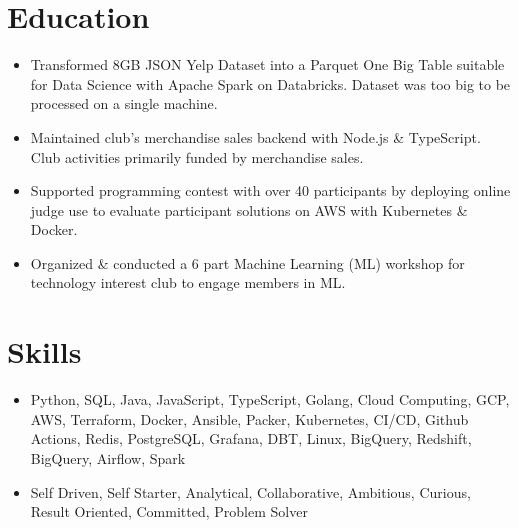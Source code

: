 \section{Education}
\begin{itemize}
  \item Transformed 8GB JSON Yelp Dataset into a Parquet One Big Table suitable for Data Science with Apache Spark on Databricks. Dataset was too big to be processed on a single machine.
  \item Maintained club's merchandise sales backend with Node.js \& TypeScript. Club activities primarily funded by merchandise sales.
\end{itemize}
\begin{itemize}
  \item Supported programming contest with over 40 participants by deploying online judge use to evaluate participant solutions on AWS with Kubernetes \& Docker.
  \item Organized \& conducted a 6 part Machine Learning  (ML) workshop for technology interest club to engage members in ML.
\end{itemize}
  
\section{Skills}
\begin{itemize}
  \item Python, SQL, Java, JavaScript, TypeScript, Golang, Cloud Computing, GCP, AWS, Terraform, Docker, Ansible, Packer, Kubernetes, CI/CD, Github Actions, Redis, PostgreSQL, Grafana, DBT, Linux, BigQuery, Redshift, BigQuery, Airflow, Spark
  \item Self Driven, Self Starter, Analytical, Collaborative, Ambitious, Curious, Result Oriented, Committed, Problem Solver
\end{itemize}
